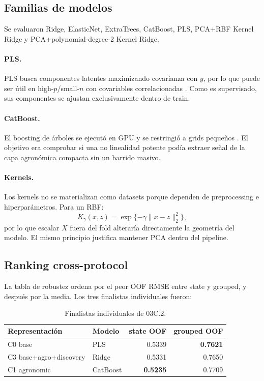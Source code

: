 \subsection{Familias de modelos}

Se evaluaron Ridge, ElasticNet, ExtraTrees, CatBoost, PLS, PCA+RBF Kernel Ridge y
PCA+polynomial-degree-2 Kernel Ridge.

\paragraph{PLS.}
PLS busca componentes latentes maximizando covarianza con $y$, por lo que puede ser útil en
high-$p$/small-$n$ con covariables correlacionadas \citep{Wold2001}. Como es supervisado,
sus componentes se ajustan exclusivamente dentro de train.

\paragraph{CatBoost.}
El boosting de árboles se ejecutó en GPU y se restringió a grids pequeños
\citep{CatBoost2018}. El objetivo era comprobar si una no linealidad potente podía extraer
señal de la capa agronómica compacta sin un barrido masivo.

\paragraph{Kernels.}
Los kernels no se materializan como datasets porque dependen de preprocessing e
hiperparámetros. Para un RBF:
\[
K_\gamma(x,z)=\exp\{-\gamma\|x-z\|_2^2\},
\]
por lo que escalar $X$ fuera del fold alteraría directamente la geometría del modelo. El mismo
principio justifica mantener PCA dentro del pipeline.

\subsection{Ranking cross-protocol}

La tabla de robustez ordena por el peor OOF RMSE entre state y grouped, y después por la media.
Los tres finalistas individuales fueron:

\begin{table}[H]
\centering
\caption{Finalistas individuales de 03C.2.}
\label{tab:cp03c2-finalists}
\begin{tabular}{llrr}
\toprule
Representación & Modelo & state OOF & grouped OOF \\
\midrule
C0 base & PLS & 0.5339 & \textbf{0.7621} \\
C3 base+agro+discovery & Ridge & 0.5331 & 0.7650 \\
C1 agronomic & CatBoost & \textbf{0.5235} & 0.7709 \\
\bottomrule
\end{tabular}
\end{table}


